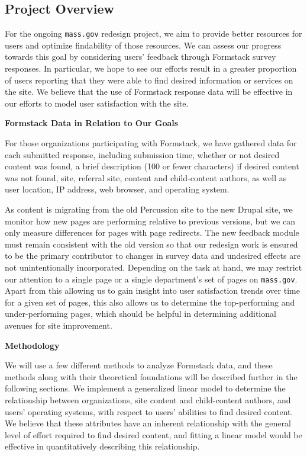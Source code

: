 \subsection*{Project Overview}
For the ongoing \texttt{mass.gov} redesign project, we aim to provide better resources for users and optimize findability of those resources. We can assess our progress towards this goal by considering users' feedback through Formstack survey responses. In particular, we hope to see our efforts result in a greater proportion of users reporting that they were able to find desired information or services on the site. We believe that the use of Formstack response data will be effective in our efforts to model user satisfaction with the site.

\textbf{Formstack Data in Relation to Our Goals}

For those organizations participating with Formstack, we have gathered data for each submitted response, including submission time, whether or not desired content was found, a brief description (100 or fewer characters) if desired content was not found, site, referral site, content and child-content authors, as well as user location, IP address, web browser, and operating system.

As content is migrating from the old Percussion site to the new Drupal site, we monitor how new pages are performing relative to previous versions, but we can only measure differences for pages with page redirects. The new feedback module must remain consistent with the old version so that our redesign work is ensured to be the primary contributor to changes in survey data and undesired effects are not unintentionally incorporated. Depending on the task at hand, we may restrict our attention to a single page or a single department's set of pages on \texttt{mass.gov}. Apart from this allowing us to gain insight into user satisfaction trends over time for a given set of pages, this also allows us to determine the top-performing and under-performing pages, which should be helpful in determining additional avenues for site improvement.

\textbf{Methodology}

We will use a few different methods to analyze Formstack data, and these methods along with their theoretical foundations will be described further in the following sections. We implement a generalized linear model to determine the relationship between organizations, site content and child-content authors,  and users' operating systems, with respect to users' abilities to find desired content. We believe that these attributes have an inherent relationship with the general level of effort required to find desired content, and fitting a linear model would be effective in quantitatively describing this relationship.

